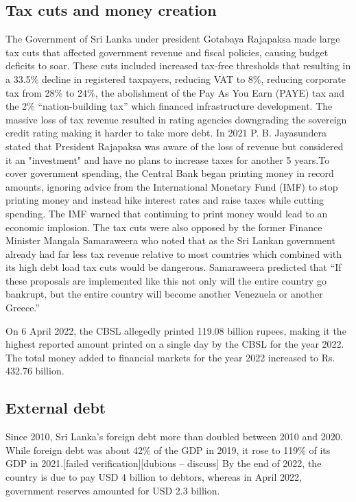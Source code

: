 \documentclass[a4paper,12pt]{article}
\begin{document}
\subsection{Tax cuts and money creation}
The Government of Sri Lanka under president Gotabaya Rajapaksa made large tax cuts that affected government revenue and fiscal policies, causing budget deficits to soar. These cuts included increased tax-free thresholds that resulting in a 33.5\% decline in registered taxpayers, reducing VAT to 8\%, reducing corporate tax from 28\% to 24\%, the abolishment of the Pay As You Earn (PAYE) tax and the 2\% “nation-building tax” which financed infrastructure development. The massive loss of tax revenue resulted in rating agencies downgrading the sovereign credit rating making it harder to take more debt. In 2021 P. B. Jayasundera stated that President Rajapaksa was aware of the loss of revenue but considered it an "investment" and have no plans to increase taxes for another 5 years.To cover government spending, the Central Bank began printing money in record amounts, ignoring advice from the International Monetary Fund (IMF) to stop printing money and instead hike interest rates and raise taxes while cutting spending. The IMF warned that continuing to print money would lead to an economic implosion. The tax cuts were also opposed by the former Finance Minister Mangala Samaraweera who noted that as the Sri Lankan government already had far less tax revenue relative to most countries which combined with its high debt load tax cuts would be dangerous. Samaraweera predicted that “If these proposals are implemented like this not only will the entire country go bankrupt, but the entire country will become another Venezuela or another Greece.”

On 6 April 2022, the CBSL allegedly printed 119.08 billion rupees, making it the highest reported amount printed on a single day by the CBSL for the year 2022. The total money added to financial markets for the year 2022 increased to Rs. 432.76 billion.

\subsection{External debt}
Since 2010, Sri Lanka's foreign debt more than doubled between 2010 and 2020. While foreign debt was about 42\% of the GDP in 2019, it rose to 119\% of its GDP in 2021.[failed verification][dubious – discuss] By the end of 2022, the country is due to pay USD 4 billion to debtors, whereas in April 2022, government reserves amounted for USD 2.3 billion.
\end{document}
